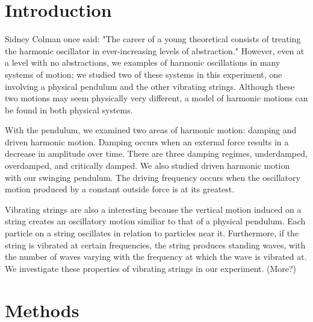 \documentclass[11pt]{report}
\begin{document}
\newpage

\section*{Introduction}
Sidney Colman once said: "The career of a young theoretical consists of treating
the harmonic oscillator in ever-increasing levels of abstraction." However, even
at a level with no abstractions, we examples of harmonic oscillations in many
systems of motion; we studied two of these systems in this experiment, one involving 
a physical pendulum and the other vibrating strings. Although these two motions 
may seem physically very different, a model of harmonic motions can be found 
in both physical systems.

With the pendulum, we examined two areas of harmonic motion: damping and driven
harmonic motion. Damping occurs when an external force results in a decrease in
amplitude over time. There are three damping regimes, underdamped, overdamped, and 
critically damped. We also studied driven harmonic motion with our swinging pendulum.
The driving frequency occurs when the oscillatory motion produced by a constant
outside force is at its greatest.  

Vibrating strings are also a interesting because the vertical motion induced on
a string creates an oscillatory motion similiar to that of a physical pendulum. 
Each particle on a string oscillates in relation to particles near it.
Furthermore, if the string is vibrated at certain frequencies, the string 
produces standing waves, with the number of waves varying with the frequency 
at which the wave is vibrated at. We investigate these properties of vibrating 
strings in our experiment. (More?)

\section*{Methods}
\end{document}
